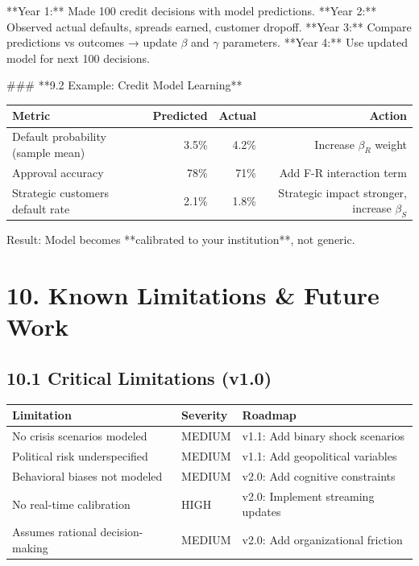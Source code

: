 \documentclass[11pt]{article}
\begin{document}
**Year 1:** Made 100 credit decisions with model predictions.
**Year 2:** Observed actual defaults, spreads earned, customer dropoff.
**Year 3:** Compare predictions vs outcomes → update $\beta$ and $\gamma$ parameters.
**Year 4:** Use updated model for next 100 decisions.

### **9.2 Example: Credit Model Learning**

\begin{table}[h]
\centering
\begin{tabular}{|l|r|r|r|}
\hline
\textbf{Metric} & \textbf{Predicted} & \textbf{Actual} & \textbf{Action} \\
\hline
Default probability (sample mean) & 3.5\% & 4.2\% & Increase $\beta_R$ weight \\
Approval accuracy & 78\% & 71\% & Add F-R interaction term \\
Strategic customers default rate & 2.1\% & 1.8\% & Strategic impact stronger, increase $\beta_S$ \\
\hline
\end{tabular}
\end{table}

Result: Model becomes **calibrated to your institution**, not generic.

\section{10. Known Limitations \& Future Work}

\subsection{10.1 Critical Limitations (v1.0)}

\begin{table}[h]
\centering
\begin{tabular}{|l|l|l|}
\hline
\textbf{Limitation} & \textbf{Severity} & \textbf{Roadmap} \\
\hline
No crisis scenarios modeled & MEDIUM & v1.1: Add binary shock scenarios \\
Political risk underspecified & MEDIUM & v1.1: Add geopolitical variables \\
Behavioral biases not modeled & MEDIUM & v2.0: Add cognitive constraints \\
No real-time calibration & HIGH & v2.0: Implement streaming updates \\
Assumes rational decision-making & MEDIUM & v2.0: Add organizational friction \\
\hline
\end{tabular}
\end{table}
\end{document}

